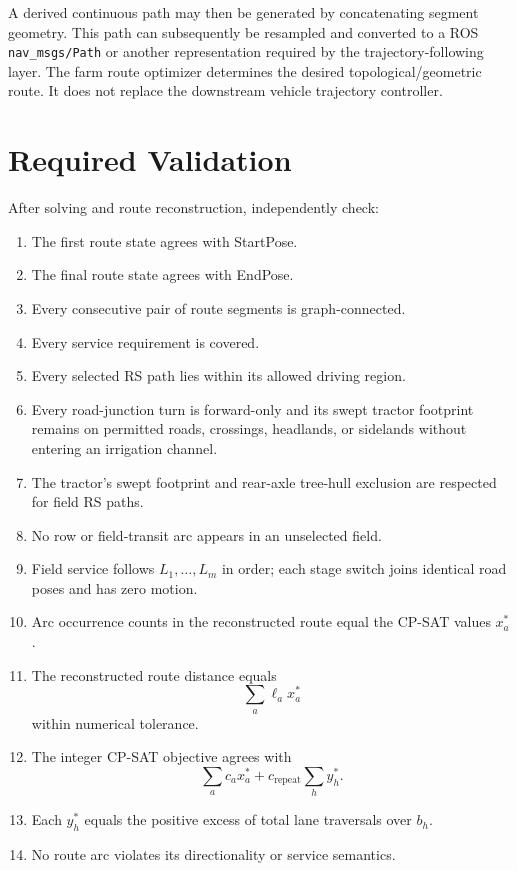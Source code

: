 \documentclass{article}
\begin{document}
A derived continuous path may then be generated by concatenating segment geometry.
This path can subsequently be resampled and converted to a ROS
\texttt{nav\_msgs/Path} or another representation required by the trajectory-following layer.
The farm route optimizer determines the desired topological/geometric route.
It does not replace the downstream vehicle trajectory controller.

\section{Required Validation}

After solving and route reconstruction, independently check:
\begin{enumerate}
\item The first route state agrees with StartPose.
\item The final route state agrees with EndPose.
\item Every consecutive pair of route segments is graph-connected.
\item Every service requirement is covered.
\item Every selected RS path lies within its allowed driving region.
\item Every road-junction turn is forward-only and its swept tractor footprint remains on permitted roads, crossings, headlands, or sidelands without entering an irrigation channel.
\item The tractor's swept footprint and rear-axle tree-hull exclusion are respected for field RS paths.
\item No row or field-transit arc appears in an unselected field.
\item Field service follows $L_1,\ldots,L_m$ in order; each stage switch joins identical road poses and has zero motion.
\item Arc occurrence counts in the reconstructed route equal the CP-SAT values $x_a^*$.
\item The reconstructed route distance equals
\[
\sum_a \ell_a x_a^*
\]
within numerical tolerance.
\item The integer CP-SAT objective agrees with
\[
\sum_a c_a x_a^*+c_{\mathrm{repeat}}\sum_h y_h^*.
\]
\item Each $y_h^*$ equals the positive excess of total lane traversals over $b_h$.
\item No route arc violates its directionality or service semantics.
\end{enumerate}
\end{document}
